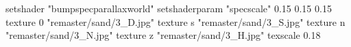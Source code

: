 setshader "bumpspecparallaxworld"
setshaderparam "specscale" 0.15 0.15 0.15
    texture 0 "remaster/sand/3_D.jpg"
    texture s "remaster/sand/3_S.jpg"
    texture n "remaster/sand/3_N.jpg"
    texture z "remaster/sand/3_H.jpg"
    texscale 0.18
